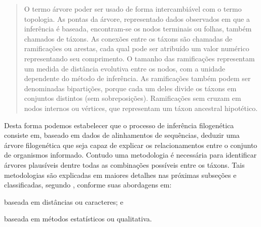 \documentclass[english,brazilian]{UNISINOSmonografia} %
\begin{document}


\begin{quote}
	O termo árvore poder ser usado de forma intercambiável com o termo topologia.
	As pontas da árvore, representado dados observados em que a inferência é baseada, encontram-se os nodos terminais ou folhas, também chamados de táxons.
	As conexões entre os táxons são chamadas de ramificações ou arestas, cada qual pode ser atribuído um valor numérico representando seu comprimento.
	O tamanho das ramificações representam um medida de distância evolutiva entre os nodos, com a unidade dependente do método de inferência.
	As ramificações também podem ser denominadas bipartições, porque cada um deles divide os táxons em conjuntos distintos (sem sobreposições).
	Ramificações sem cruzam em nodos internos ou vértices, que representam um táxon ancestral hipotético.
\end{quote}


Desta forma podemos estabelecer que o processo de inferência filogenética consiste em, baseado em dados de alinhamentos de sequências, deduzir uma árvore filogenética que seja capaz de explicar os relacionamentos entre o conjunto de organismos informado.
Contudo uma metodologia é necessária para identificar árvores plausíveis dentre todas as combinações possíveis entre os táxons.
Tais metodologias são explicadas em maiores detalhes nas próximas subseções e classificadas, segundo , conforme suas abordagens em: 
\begin{inparaenum} 
	\item baseada em distâncias ou caracteres; e
	\item baseada em métodos estatísticos ou qualitativa.
\end{inparaenum}
\end{document}
